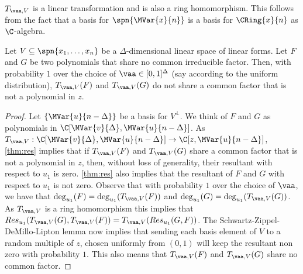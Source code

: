 \begin{observation}
$T_{\vaa, V}$ is a linear transformation and is also a ring homomorphism. This follows from the fact that a basis for $\spn{\MVar{x}{n}}$ is a basis for $\CRing{x}{n}$ as $\C$-algebra. 
\end{observation}





































\begin{claim}\label{cla:res-z-ampping}
	Let $V\subseteq \spn{x_1,\ldots,x_n}$ be a $\Delta$-dimensional linear space of linear forms. Let $F$ and  $G$ be two polynomials that share no common irreducible factor. Then, with probability $1$ over the choice of $\vaa \in [0,1]^{\Delta}$ (say according to the uniform distribution), $T_{\vaa, V}(F)$ and $T_{\vaa, V}(G)$ do not share a common factor that is not a polynomial in $z$.
\end{claim}

\begin{proof}
	Let $\lbrace\MVar{u}{{n-\Delta}}\rbrace$ be a basis for $V^\perp$. We think of $F$ and $G$ as polynomials in $\C[\MVar{v}{\Delta}, \MVar{u}{n-\Delta}]$.
	As $T_{\vaa,V}: \C[\MVar{v}{\Delta}, \MVar{u}{n-\Delta}] \rightarrow \C[z, \MVar{u}{n-\Delta}]$,  
	\autoref{thm:res} implies that if $T_{\vaa, V}(F)$ and  $T_{\vaa, V}(G)$ share a common factor that is not a polynomial in $z$, then, without loss of generality, their resultant with respect to $u_1$ is zero. \autoref{thm:res} also implies that the resultant of $F$ and $G$ with respect to $u_1$ is not zero. Observe that with probability $1$ over the choice of $\vaa$, we have that $\deg_{u_1}(F) = \deg_{u_1}(T_{\vaa, V}(F))$ and $\deg_{u_1}(G) = \deg_{u_1}(T_{\vaa, V}(G))$.
	As $T_{\vaa, V}$ is a ring homomorphism this implies that $Res_{u_1}(T_{\vaa, V}(G), T_{\vaa, V}(F)) = T_{\vaa, V}(Res_{u_1}(G, F))$.  The Schwartz-Zippel-DeMillo-Lipton lemma now implies that sending each basis element of $V$ to a random multiple of $z$, chosen uniformly from $(0,1)$ will keep the resultant non zero with probability $1$. This also means that $T_{\vaa, V}(F)$ and $T_{\vaa, V}(G)$ share no common factor.
\end{proof}

